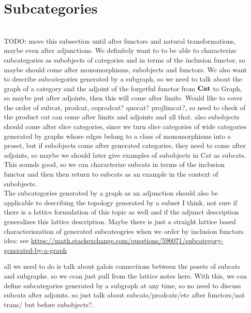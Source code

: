 \documentclass{book}
\begin{document}
	\section{Subcategories}
	
	\\
	
	TODO: move this subsection until after functors and natural transformations, maybe even after adjunctions. We definitely want to to be able to characterize subcategories as subobjects of categories and in terms of the inclusion functor, so maybe should come after monomorphisms, subobjects and functors.  We also want to describe subcategories generated by a subgraph, so we need to talk about the graph of a category and the adjoint of the forgetful functor from $\operatorname*{\text{\textbf{Cat}}}$ to Graph, so maybe put after adjoints, then this will come after limits. Would like to cover the order of subcat, prodcat, coprodcat? quocat? projlimcat?, so need to check of the product cat can come after limits and adjoints and all that. also subobjects should come after slice categories, since we turn slice categories of wide categories generated by graphs whose edges belong to a class of monomorphisms into a proset, but if subobjects come after generated categories, they need to come after adjoints, so maybe we should later give examples of subobjects in Cat as subcats. This sounds good, so we can characterize subcats in terms of the inclusion functor and then then return to subcats as an example in the context of subobjects.\\
	
	The subcategories generated by a graph as an adjunction should also be applicable to describing the topology generated by a subset I think, not sure if there is a lattice formulation of this topic as well and if the adjunct description generalizes this lattice description. Maybe there is just a straight lattice based characteriszation of generated subcateogries when we order by inclusion functors.\\
	
	
	idea: see \href{https://math.stackexchange.com/questions/596071/subcategory-generated-by-a-graph}{https://math.stackexchange.com/questions/596071/subcategory-generated-by-a-graph}
	
	all we need to do is talk about galois connections between the posets of subcats and subgraphs. so we ccan just pull from the lattice notes here. With this, we can define subcategories generated by a subgraph at any time, so no need to discuss subcats after adjoints. so just talk about subcats/prodcats/etc after functors/nat trans/ but before subobjects?. 
	
\end{document}
